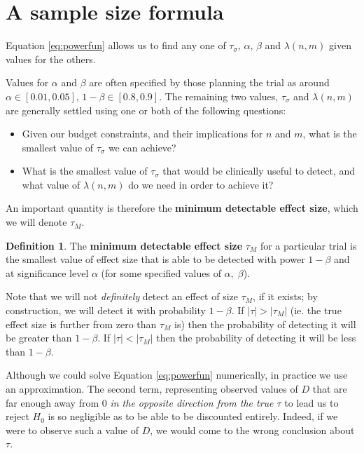 \documentclass[
  openany]{book}
\providecommand{\tightlist}{%
  \setlength{\itemsep}{0pt}\setlength{\parskip}{0pt}}
\theoremstyle{definition}
\newtheorem{definition}{Definition}[chapter]
\theoremstyle{definition}
\theoremstyle{definition}
\theoremstyle{definition}
\theoremstyle{remark}
\begin{document}
\section{A sample size formula}\label{sec-ssformulacont}

Equation \eqref{eq:powerfun} allows us to find any one of \(\tau_\sigma,\,\alpha,\,\beta\) and \(\lambda\left(n,m\right)\) given values for the others.

Values for \(\alpha\) and \(\beta\) are often specified by those planning the trial as around \(\alpha \in \left[0.01,0.05\right],\,1-\beta\in\left[0.8,0.9\right]\). The remaining two values, \(\tau_\sigma\) and \(\lambda\left(n,m\right)\) are generally settled using one or both of the following questions:

\begin{itemize}
\tightlist
\item
  Given our budget constraints, and their implications for \(n\) and \(m\), what is the smallest value of \(\tau_\sigma\) we can achieve?
\item
  What is the smallest value of \(\tau_\sigma\) that would be clinically useful to detect, and what value of \(\lambda\left(n,m\right)\) do we need in order to achieve it?
\end{itemize}

An important quantity is therefore the \textbf{minimum detectable effect size}, which we will denote \(\tau_M\).

\begin{definition}
The \textbf{minimum detectable effect size} \(\tau_M\) for a particular trial is the smallest value of effect size that is able to be detected with power \(1-\beta\) and at significance level \(\alpha\) (for some specified values of \(\alpha,\;\beta\)).
\end{definition}

Note that we will not \emph{definitely} detect an effect of size \(\tau_M\), if it exists; by construction, we will detect it with probability \(1-\beta\). If \(|\tau| > |\tau_M|\) (ie. the true effect size is further from zero than \(\tau_M\) is) then the probability of detecting it will be greater than \(1-\beta\). If \(|\tau| < |\tau_M|\) then the probability of detecting it will be less than \(1-\beta\).

Although we could solve Equation \eqref{eq:powerfun} numerically, in practice we use an approximation. The second term, representing observed values of \(D\) that are far enough away from 0 \emph{in the opposite direction from the true \(\tau\)} to lead us to reject \(H_0\) is so negligible as to be able to be discounted entirely. Indeed, if we were to observe such a value of \(D\), we would come to the wrong conclusion about \(\tau\).
\end{document}
